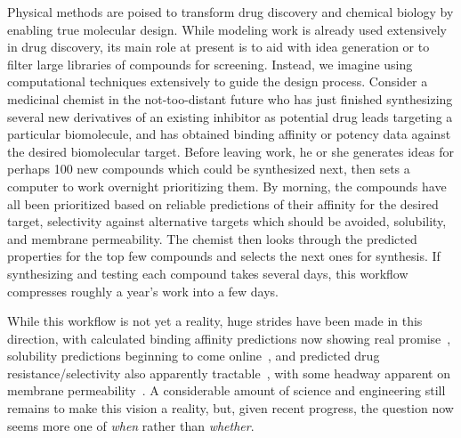 \documentclass[11pt]{article}
\begin{document}
Physical methods are poised to transform drug discovery and chemical biology by enabling true molecular design. 
While modeling work is already used extensively in drug discovery, its main role at present is to aid with idea generation or to filter large libraries of compounds for screening. 
Instead, we imagine using computational techniques extensively to guide the design process. 
Consider a medicinal chemist in the not-too-distant future who has just finished synthesizing several new derivatives of an existing inhibitor as potential drug leads targeting a particular biomolecule, and has obtained binding affinity or potency data against the desired biomolecular target. 
Before leaving work, he or she generates ideas for perhaps 100 new compounds which could be synthesized next, then sets a computer to work overnight prioritizing them. 
By morning, the compounds have all been prioritized based on reliable predictions of their affinity for the desired target, selectivity against alternative targets which should be avoided, solubility, and membrane permeability.  
The chemist then looks through the predicted properties for the top few compounds and selects the next ones for synthesis. 
If synthesizing and testing each compound takes several days, this workflow compresses roughly a year's work into a few days.

While this workflow is not yet a reality, huge strides have been made in this direction, with calculated binding affinity predictions now showing real promise~\cite{mobley_perspective_2012, christ_accuracy_2014, deng_distinguishing_2015, sherborne_preprint_2016, schrodinger_accurate_2015, christ_binding_2016, cui_affinity_2016, verras_free_2016}, solubility predictions beginning to come online~\cite{schnieders_structure_2012, park_absolute_2014, liu_using_2016}, and predicted drug resistance/selectivity also apparently tractable~\cite{leonis_contribution_2013}, with some headway apparent on membrane permeability~\cite{lee_permeability_2016, comer_permeability_2014}. 
A considerable amount of science and engineering still remains to make this vision a reality, but, given recent progress, the question now seems more one of \emph{when} rather than \emph{whether}. 
\end{document}
